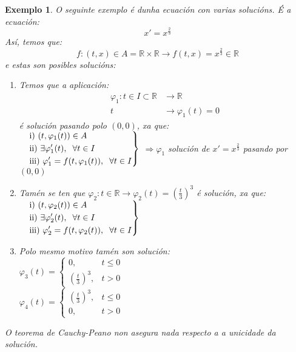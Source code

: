 \documentclass[11pt, a4paper,twoside]{article}
\theoremstyle{theorem-style}  %
\theoremstyle{definition-style}
\theoremstyle{example-style}
\newtheorem{example}{Exemplo}[section]
\newenvironment{rcases}
{\left.\begin{aligned}}
	{\end{aligned}\right\rbrace}
\begin{document}
\begin{example}
	O seguinte exemplo é dunha ecuación con varias solucións. É a ecuación:
	\[x'=x^{\frac{2}{3}}\]
	Así, temos que:
	\[f:(t, x)\in A = \mathbb{R} \times \mathbb{R} \longrightarrow f(t, x) = x^{\frac{2}{3}} \in \mathbb{R}\]
	e estas son posibles solucións: 
	\begin{enumerate}
		\item Temos que a aplicación:
		\begin{align*}
		\varphi_1: t \in I \subset \mathbb{R}& \longrightarrow \mathbb{R}\\
		t& \longrightarrow \varphi_1 (t) = 0
		\end{align*}
		é solución pasando polo $(0,0)$, xa que:\\
		$
		\begin{rcases}
			\quad&\text{i) } (t, \varphi_1 (t)) \in A \\
			&\text{ii) }\exists \varphi_1' (t),  \hspace{0,2cm} \forall t \in I \\
			&\text{iii) } \varphi_1' = f(t, \varphi_1 (t)), \hspace{0,2cm} \forall t \in I
		\end{rcases}$ $\Rightarrow \varphi_1$ solución de $x'=x^{\frac{2}{3}}$ pasando por $(0,0)$
		
		\item Tamén se ten que $\varphi_2: t \in \mathbb{R} \longrightarrow \varphi_2 (t) = (\frac{t}{3})^3$ é solución, xa que:\\
		$
		\begin{rcases}
			\quad&\text{i) } (t, \varphi_2 (t)) \in A \\
			&\text{ii) }\exists \varphi_2' (t),  \hspace{0,2cm} \forall t \in I \\
			&\text{iii) } \varphi_2' = f(t, \varphi_2 (t)), \hspace{0,2cm} \forall t \in I
		\end{rcases}$
		\item Polo mesmo motivo tamén son solución:\\
		$\varphi_3 (t) = \begin{cases}
			0, &t\leq 0 \\
			(\frac{t}{3})^3, &t>0 
		\end{cases}$ \\
		$\varphi_4 (t) = \begin{cases}
		(\frac{t}{3})^3, &t\leq 0\\
		0, &t>0 
		\end{cases}$ 
	\end{enumerate}
O teorema de Cauchy-Peano non asegura nada respecto a a unicidade da solución.
\end{example}
\end{document}
